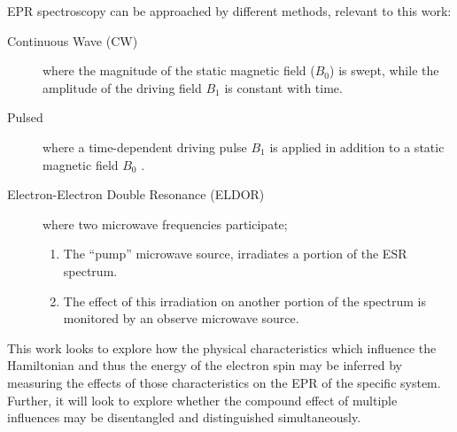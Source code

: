 EPR spectroscopy can be approached by different methods, relevant to this work:
\begin{description}
	\item [Continuous Wave (CW)] where the magnitude of the static magnetic field ($B_0$) is swept, while the
	      amplitude of the driving field $B_1$ is constant with time.
	\item [Pulsed] where a time-dependent driving pulse $B_1$ is applied in
        addition to a static magnetic field $B_0$ \cite{Baranov2017-bv}.


    \item[Electron-Electron Double Resonance (ELDOR)] where two microwave frequencies participate;
        \begin{enumerate}
            \item The “pump” microwave source, irradiates a portion of the ESR spectrum. 
            \item The effect of this irradiation on another portion of the spectrum is monitored by an observe microwave source. \cite{Berliner2011-ww}


        \end{enumerate}
\end{description}

This work looks to explore how the physical characteristics which influence the Hamiltonian and thus the energy of the electron spin may be inferred by measuring the effects of those characteristics on the EPR of the specific system. Further, it will look to explore whether the compound effect of multiple influences may be disentangled and distinguished simultaneously.




